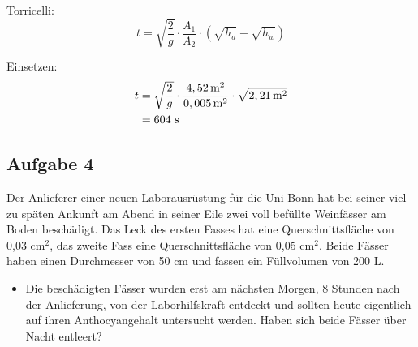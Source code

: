 \documentclass[a4paper,11pt]{article}
\newif\ifshowme
\begin{document}
\begin{marginfigure}[+2cm]
{\ppbig
Torricelli:
\begin{equation}
t = \sqrt{\frac{2}{g}} \cdot \frac{A_1}{A_2} \cdot (\sqrt{h_a} - \sqrt{h_w})
\end{equation}

Einsetzen:
\begin{align*}
t &= \sqrt{\frac{2}{g}} \cdot \frac{4,52\mskip3mu \text{m}^2}{0,005\mskip3mu \text{m}^2} \cdot \sqrt{2,21\mskip3mu \text{m}^2} \\
&= 604 ~\text{s}
\end{align*}
}



\pagebreak
\else
\fi
\pagebreak

\subsection*{Aufgabe 4}
Der Anlieferer einer neuen Laborausrüstung für die Uni Bonn hat bei seiner viel zu späten Ankunft am Abend in seiner Eile zwei voll befüllte Weinfässer am Boden beschädigt. Das Leck des ersten Fasses hat eine Querschnittsfläche von 0,03 cm$^2$, das zweite Fass eine Querschnittsfläche von 0,05 cm$^2$. Beide Fässer haben einen Durchmesser von 50 cm und fassen ein Füllvolumen von 200 L. \par 

\begin{marginfigure}[0cm]
\centering
{}
\end{marginfigure}
\ifshowme
\vspace*{0mm}
\else
\fi 
\begin{itemize}
\item Die beschädigten Fässer wurden erst am nächsten Morgen, 8 Stunden nach der Anlieferung, von der Laborhilfskraft entdeckt und sollten heute eigentlich auf ihren Anthocyangehalt untersucht werden. Haben sich beide Fässer über Nacht entleert?
\ifshowme
{}
\end{itemize}
\end{marginfigure}
\end{document}
